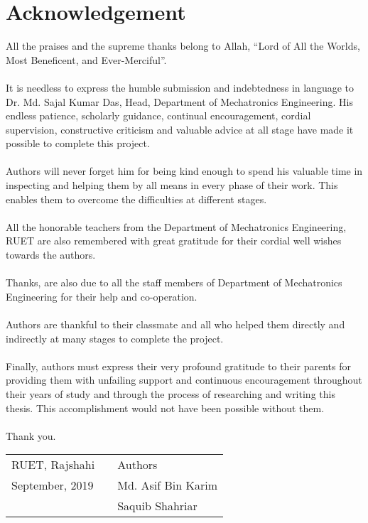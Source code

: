 \chapter*{\textbf{Acknowledgement}}
All the praises and the supreme thanks belong to Allah, “Lord of All the Worlds, Most Beneficent, and Ever-Merciful”.\\\\
It is needless to express the humble submission and indebtedness in language to Dr. Md. Sajal Kumar Das, Head, Department of Mechatronics Engineering. His endless patience, scholarly guidance, continual encouragement, cordial supervision, constructive criticism and valuable advice at all stage have made it possible to complete this project.\\\\
Authors will never forget him for being kind enough to spend his valuable time in inspecting and helping them by all means in every phase of their work. This enables them to overcome the difficulties at different stages.\\\\
All the honorable teachers from the Department of Mechatronics Engineering, RUET are also remembered with great gratitude for their cordial well wishes towards the authors.\\\\
Thanks, are also due to all the staff members of Department of Mechatronics Engineering for their help and co-operation.\\\\
Authors are thankful to their classmate and all who helped them directly and indirectly at many stages to complete the project.\\\\
Finally, authors must express their very profound gratitude to their parents for providing them with unfailing support and continuous encouragement throughout their years of study and through the process of researching and writing this thesis. This accomplishment would not have been possible without them.\\\\
Thank you.

\vspace{3cm}
\hspace{-0.9cm}
\begin{tabular}{p{}cp{}}
RUET, Rajshahi && Authors\\
September, 2019 && Md. Asif Bin Karim \\
 && Saquib Shahriar
\end{tabular}

